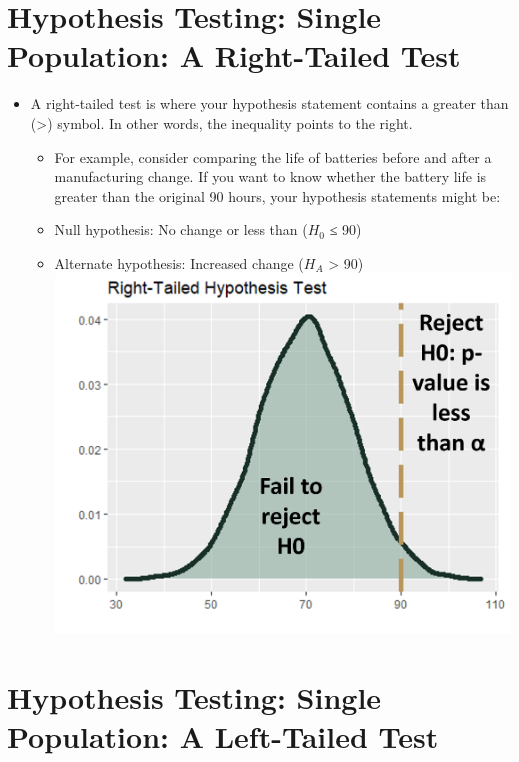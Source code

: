 \documentclass[
  letterpaper,
  DIV=11,
  numbers=noendperiod]{scrreprt}
\providecommand{\tightlist}{%
  \setlength{\itemsep}{0pt}\setlength{\parskip}{0pt}}\usepackage{longtable,booktabs,array}
\begin{document}
\section{Hypothesis Testing: Single Population: A Right-Tailed
Test}\label{hypothesis-testing-single-population-a-right-tailed-test}

\begin{itemize}
\tightlist
\item
  A right-tailed test is where your hypothesis statement contains a
  greater than (\textgreater) symbol. In other words, the inequality
  points to the right.

  \begin{itemize}
  \tightlist
  \item
    For example, consider comparing the life of batteries before and
    after a manufacturing change. If you want to know whether the
    battery life is greater than the original 90 hours, your hypothesis
    statements might be:
  \item
    Null hypothesis: No change or less than (\(H_0\) ≤ 90)
  \item
    Alternate hypothesis: Increased change (\(H_A\) \textgreater{} 90)
    \includegraphics{Pictures/Ch6/RightTailedHTest.png}
  \end{itemize}
\end{itemize}

\section{Hypothesis Testing: Single Population: A Left-Tailed
Test}\label{hypothesis-testing-single-population-a-left-tailed-test}
\end{document}
